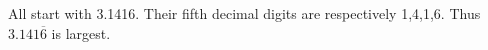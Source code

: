 All start with 3.1416. Their fifth decimal digits are respectively 1,4,1,6. Thus $\boxed{3.141\overline6}$ is largest.
